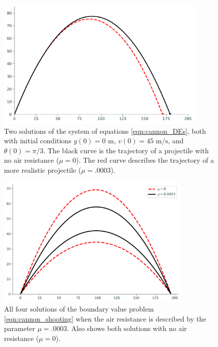 \begin{figure}[H]
\includegraphics[height=2.5in]{figures/cannon_comparison.pdf}
\caption{Two solutions of the system of equations \eqref{eqn:cannon_DEs}, both with initial conditions  $y(0) = 0 \text{ m}$, $ v(0) = 45 \text{ m/s}$, and $\theta(0)=\pi/3$.
The black curve is the trajectory of a projectile with no air resistance ($\mu = 0$).
The red curve describes the trajectory of a more realistic projectile ($\mu = .0003$).}
\label{fig:shooting_cannon_comparison1}
\end{figure}

\begin{figure}[H]
\includegraphics[height=2.5in]{figures/problem3.pdf}
\caption{All four solutions of the boundary value problem \eqref{eqn:cannon_shooting} when the air resistance is described by the parameter $\mu = .0003$.
Also shows both solutions with no air resistance ($\mu = 0$).}
\label{fig:shooting_cannon_comparison2}
\end{figure} 